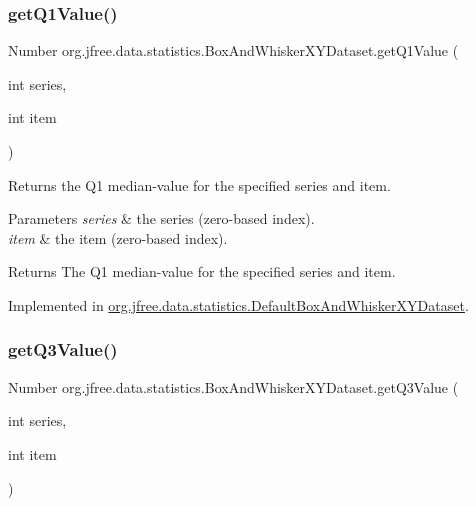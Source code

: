 \subsubsection{\texorpdfstring{get\+Q1\+Value()}{getQ1Value()}}
{\footnotesize\ttfamily Number org.\+jfree.\+data.\+statistics.\+Box\+And\+Whisker\+X\+Y\+Dataset.\+get\+Q1\+Value (\begin{DoxyParamCaption}\item[{int}]{series,  }\item[{int}]{item }\end{DoxyParamCaption})}

Returns the Q1 median-\/value for the specified series and item.


\begin{DoxyParams}{Parameters}
{\em series} & the series (zero-\/based index). \\
\hline
{\em item} & the item (zero-\/based index).\\
\hline
\end{DoxyParams}
\begin{DoxyReturn}{Returns}
The Q1 median-\/value for the specified series and item. 
\end{DoxyReturn}


Implemented in \mbox{\hyperlink{classorg_1_1jfree_1_1data_1_1statistics_1_1_default_box_and_whisker_x_y_dataset_acc9e0188091c4431574b0da61d5e2311}{org.\+jfree.\+data.\+statistics.\+Default\+Box\+And\+Whisker\+X\+Y\+Dataset}}.

\mbox{\label{interfaceorg_1_1jfree_1_1data_1_1statistics_1_1_box_and_whisker_x_y_dataset_aa0a7303f8abdc2cc56f5c4a1cdff2c49}} 
\subsubsection{\texorpdfstring{get\+Q3\+Value()}{getQ3Value()}}
{\footnotesize\ttfamily Number org.\+jfree.\+data.\+statistics.\+Box\+And\+Whisker\+X\+Y\+Dataset.\+get\+Q3\+Value (\begin{DoxyParamCaption}\item[{int}]{series,  }\item[{int}]{item }\end{DoxyParamCaption})}

